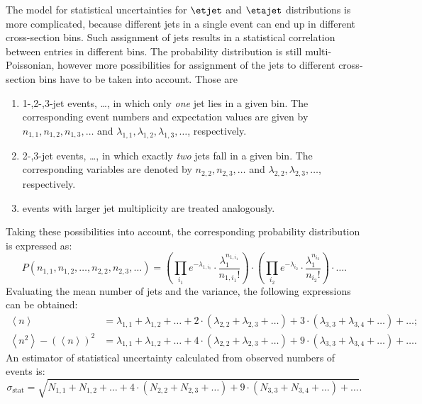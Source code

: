 The model for statistical uncertainties for $\etjet$ and $\etajet$ distributions is more complicated, because different jets in a single event can end up in different cross-section bins. Such assignment of jets results in a statistical correlation between entries in different bins. The probability distribution is still multi-Poissonian, however more possibilities for assignment of the jets to different cross-section bins have to be taken into account. Those are
 \begin{enumerate}
  \item 1-,2-,3-jet events, \ldots, in which only \textit{one} jet lies in a given bin. The corresponding event numbers and expectation values are given by $n_{1,1}, n_{1,2}, n_{1,3}, \ldots$ and $\lambda_{1,1}, \lambda_{1,2}, \lambda_{1,3}, \ldots$, respectively.
  \item 2-,3-jet events, \ldots, in which exactly \textit{two} jets fall in a given bin. The corresponding variables are denoted by $n_{2,2}, n_{2,3}, \ldots$ and $\lambda_{2,2}, \lambda_{2,3}, \ldots$, respectively.
  \item events with larger jet multiplicity are treated analogously.
 \end{enumerate}
Taking these possibilities into account, the corresponding probability distribution is expressed as:
\begin{equation}
P\left(n_{1,1}, n_{1,2},\ldots, n_{2,2}, n_{2,3}, \ldots \right) = \left( \prod_{i_1}{ e^{-\lambda_{1,i_1}} \cdot \frac{\lambda_1^{n_{1,{i_1}}}}{n_{1,{i_1}}!} } \right) \cdot \left( \prod_{i_2}{ e^{-\lambda_{i_2} } \cdot \frac{\lambda_1^{n_{i_2}}}{n_{i_2}!} } \right) \cdot \ldots.
\label{eq:multipoissonqsq}
\end{equation}
Evaluating the mean number of jets and the variance, the following expressions can be obtained:
\begin{align}
 \left\langle n \right\rangle &= \lambda_{1,1} + \lambda_{1,2} + \ldots + 2\cdot\left(\lambda_{2,2}+\lambda_{2,3}+\ldots\right) + 3\cdot\left( \lambda_{3,3} + \lambda_{3,4} + \ldots \right) + \ldots;\\
 \left\langle n^2 \right \rangle - \left( \left\langle n \right \rangle \right)^2 &= \lambda_{1,1} + \lambda_{1,2} + \ldots + 4\cdot\left(\lambda_{2,2}+\lambda_{2,3}+\ldots\right) + 9\cdot\left( \lambda_{3,3} + \lambda_{3,4} + \ldots \right) + \ldots. 
\end{align} 
An estimator of statistical uncertainty calculated from observed numbers of events is:
\begin{equation}
 \sigma_\text{stat} = \sqrt{ N_{1,1} + N_{1,2} + \ldots + 4\cdot\left(N_{2,2}+N_{2,3}+\ldots\right) + 9\cdot\left( N_{3,3} + N_{3,4} + \ldots \right) + \ldots}.
\end{equation}

